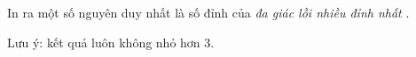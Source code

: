 In ra một số nguyên duy nhất là số đỉnh của   \textit{    đa giác lồi nhiều đỉnh nhất   }   .  

   Lưu ý: kết quả luôn không nhỏ hơn 3.  

\